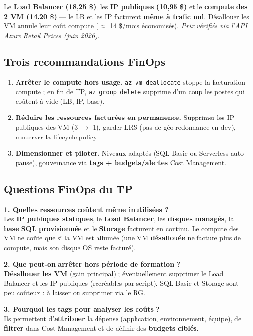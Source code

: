 \documentclass[11pt,a4paper]{article}
\newcommand{\arr}{\ensuremath{\rightarrow}}
\newcommand{\code}[1]{\texttt{#1}}
\begin{document}
\begin{notebox}
Le \textbf{Load Balancer (18,25 \$)}, les \textbf{IP publiques (10,95 \$)} et le \textbf{compute des 2 VM
(14,20 \$)} — le LB et les IP facturent \textbf{même à trafic nul}. Désallouer les VM annule leur coût compute
($\approx$ 14 \$/mois économisés). \textit{Prix vérifiés via l'API Azure Retail Prices (juin 2026).}
\end{notebox}

\subsection{Trois recommandations FinOps}
\begin{enumerate}
  \item \textbf{Arrêter le compute hors usage.} \code{az vm deallocate} stoppe la facturation compute ; en fin de TP, \code{az group delete} supprime d'un coup les postes qui coûtent à vide (LB, IP, base).
  \item \textbf{Réduire les ressources facturées en permanence.} Supprimer les IP publiques des VM (3 \arr{} 1), garder LRS (pas de géo-redondance en dev), conserver la lifecycle policy.
  \item \textbf{Dimensionner et piloter.} Niveaux adaptés (SQL Basic ou Serverless auto-pause), gouvernance via \textbf{tags + budgets/alertes} Cost Management.
\end{enumerate}

\subsection{Questions FinOps du TP}

\textbf{1. Quelles ressources coûtent même inutilisées ?}\\
Les \textbf{IP publiques statiques}, le \textbf{Load Balancer}, les \textbf{disques managés}, la \textbf{base
SQL provisionnée} et le \textbf{Storage} facturent en continu. Le compute des VM ne coûte que si la VM est
allumée (une VM \textbf{désallouée} ne facture plus de compute, mais son disque OS reste facturé).

\textbf{2. Que peut-on arrêter hors période de formation ?}\\
\textbf{Désallouer les VM} (gain principal) ; éventuellement supprimer le Load Balancer et les IP publiques
(recréables par script). SQL Basic et Storage sont peu coûteux : à laisser ou supprimer via le RG.

\textbf{3. Pourquoi les tags pour analyser les coûts ?}\\
Ils permettent d'\textbf{attribuer} la dépense (application, environnement, équipe), de \textbf{filtrer} dans
Cost Management et de définir des \textbf{budgets ciblés}.
\end{document}
